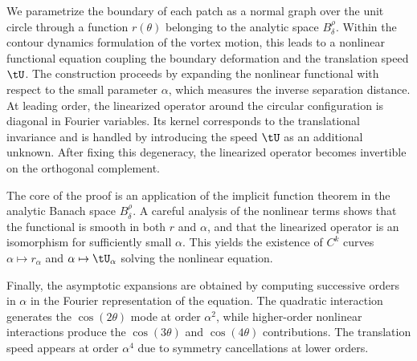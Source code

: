 \documentclass[a4paper,reqno,10pt]{article}
\begin{document}
We parametrize the boundary of each patch as a normal graph over the unit circle through a function $r(\theta)$ belonging to the analytic space $B_\delta^{\rho}$. Within the contour dynamics formulation of the vortex motion, this leads to a nonlinear functional equation coupling the boundary deformation and the translation speed \( \tU \).
The construction proceeds by expanding the nonlinear functional with respect to the small parameter $\alpha$, which measures the inverse separation distance. At leading order, the linearized operator around the circular configuration is diagonal in Fourier variables. Its kernel corresponds to the translational invariance and is handled by introducing the speed $\tU$ as an additional unknown. After fixing this degeneracy, the linearized operator becomes invertible on the orthogonal complement.

The core of the proof is an application of the implicit function theorem in the analytic Banach space $B_\delta^{\rho}$. A careful analysis of the nonlinear terms shows that the functional is smooth in both $r$ and $\alpha$, and that the linearized operator is an isomorphism for sufficiently small $\alpha$. This yields the existence of $C^k$ curves $\alpha \mapsto r_\alpha$ and $\alpha \mapsto \tU_\alpha$ solving the nonlinear equation.

Finally, the asymptotic expansions are obtained by computing successive orders in $\alpha$ in the Fourier representation of the equation. The quadratic interaction generates the $\cos(2\theta)$ mode at order $\alpha^2$, while higher-order nonlinear interactions produce the $\cos(3\theta)$ and $\cos(4\theta)$ contributions. The translation speed appears at order $\alpha^4$ due to symmetry cancellations at lower orders.
\end{document}
